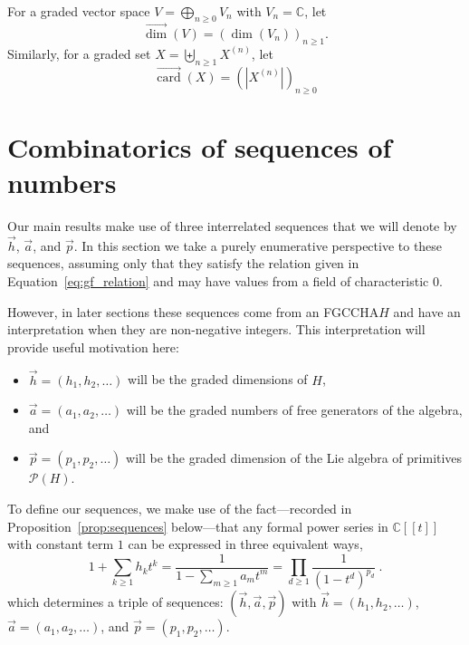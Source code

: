\documentclass[11pt]{amsart}
\theoremstyle{definition}
\numberwithin{equation}{section}
\def\CC{{\mathbb C}}
\newcommand{\FGCCHA}{\textsf{FGCCHA}\xspace}
\newcommand{\vecdim}{\overrightarrow{\dim}}
\newcommand{\veccard}{\overrightarrow{\operatorname{card}}}
\newcommand{\lucas}[1]{\todo[size=\tiny,color=red!50]{#1 \\ \hfill --- Lucas}}
\begin{document}

For a graded vector space $V = \bigoplus_{n \ge 0} V_{n}$ with $V_{n} = \CC$, let
\[
\vecdim(V) = \left( \dim(V_{n}) \right)_{n \ge 1}.
\]
Similarly, for a graded set $X = \biguplus_{n \ge 1} X^{(n)}$, let
\[
\veccard(X) = \left( |X^{(n)}| \right)_{n \ge 0}
\]

\section{Combinatorics of sequences of numbers}
\label{sec:SequencePrelims}

Our main results make use of three interrelated sequences that we will denote by $\vec{h}$, $\vec{a}$, and $\vec{p}$.  
In this section we take a purely enumerative perspective to these sequences, assuming only that they satisfy the relation given in Equation~\eqref{eq:gf_relation} and may have values from a field of characteristic $0$.

However, in later sections these sequences come from an \FGCCHA $H$ and have an interpretation when they are non-negative integers.
This interpretation will provide useful motivation here:
\begin{itemize}
\item $\vec{h} = (h_{1}, h_{2}, \ldots)$ will be the graded dimensions of $H$,

\item $\vec{a} = (a_{1}, a_{2}, \ldots)$ will be the graded numbers of free generators of the algebra, and 

\item $\vec{p} = (p_{1}, p_{2}, \ldots)$ will be the graded dimension of the Lie algebra of primitives $\mathcal{P}(H)$.

\end{itemize}

To define our sequences, we make use of the fact---recorded in Proposition~\ref{prop:sequences} below---that any formal power series in $\CC[[t]]$ with constant term $1$ can be expressed in three equivalent ways,
\begin{equation}
\label{eq:gf_relation}
1 + \sum_{k \geq 1} h_k t^k = \frac{1}{1 - \sum_{m \geq 1} a_m t^m} = \prod_{d \geq 1} \frac{1}{(1-t^d)^{p_d}}~.
\end{equation}
which determines a triple of sequences: $(\vec{h}, \vec{a}, \vec{p})$ with $\vec{h} = (h_{1}, h_{2}, \ldots)$, $\vec{a} = (a_{1}, a_{2}, \ldots)$, and $\vec{p} = (p_{1}, p_{2}, \ldots)$.  
\end{document}
